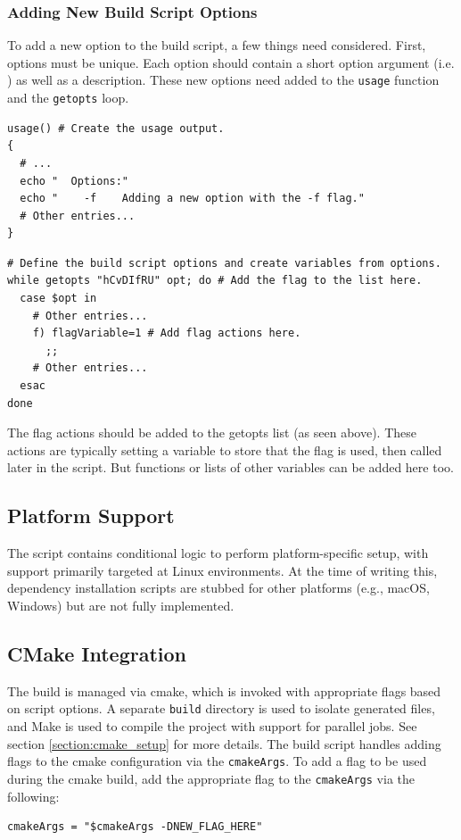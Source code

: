 \subsubsection{Adding New Build Script Options}

To add a new option to the build script, a few things need considered. First, options must be unique. Each option should contain a short option argument (i.e. ) as well as a description. These new options need added to the \texttt{usage} function and the \texttt{getopts} loop.
\begin{lstlisting}[style=shellstyle]
usage() # Create the usage output.
{
  # ...
  echo "  Options:"
  echo "    -f    Adding a new option with the -f flag."
  # Other entries...
}
\end{lstlisting}
\begin{lstlisting}[style=shellstyle]
# Define the build script options and create variables from options.
while getopts "hCvDIfRU" opt; do # Add the flag to the list here.
  case $opt in
    # Other entries...
    f) flagVariable=1 # Add flag actions here.
      ;;
    # Other entries...
  esac
done
\end{lstlisting}
The flag actions should be added to the getopts list (as seen above). These actions are typically setting a variable to store that the flag is used, then called later in the script. But functions or lists of other variables can be added here too.

\subsection{Platform Support}

The script contains conditional logic to perform platform-specific setup, with support primarily targeted at Linux environments. At the time of writing this, dependency installation scripts are stubbed for other platforms (e.g., macOS, Windows) but are not fully implemented.

\subsection{CMake Integration}

The build is managed via cmake, which is invoked with appropriate flags based on script options. A separate \texttt{build} directory is used to isolate generated files, and Make is used to compile the project with support for parallel jobs. See section \ref{section:cmake_setup} for more details. The build script handles adding flags to the cmake configuration via the \texttt{cmakeArgs}. To add a flag to be used during the cmake build, add the appropriate flag to the \texttt{cmakeArgs} via the following:
\begin{lstlisting}[style=shellstyle]
cmakeArgs = "$cmakeArgs -DNEW_FLAG_HERE"
\end{lstlisting}

